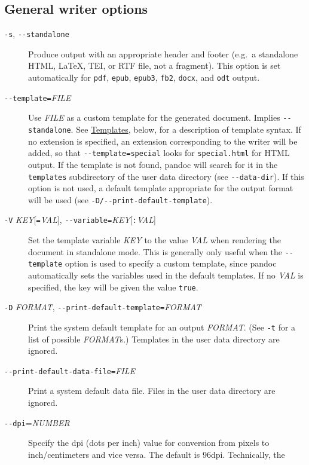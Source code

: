 \documentclass[]{article}
\begin{document}
\subsection{General writer options}\label{general-writer-options}

\begin{description}
\item[\texttt{-s}, \texttt{-\/-standalone}]
Produce output with an appropriate header and footer (e.g.~a standalone
HTML, LaTeX, TEI, or RTF file, not a fragment). This option is set
automatically for \texttt{pdf}, \texttt{epub}, \texttt{epub3},
\texttt{fb2}, \texttt{docx}, and \texttt{odt} output.
\item[\texttt{-\/-template=}\emph{FILE}]
Use \emph{FILE} as a custom template for the generated document. Implies
\texttt{-\/-standalone}. See \protect\hyperlink{templates}{Templates},
below, for a description of template syntax. If no extension is
specified, an extension corresponding to the writer will be added, so
that \texttt{-\/-template=special} looks for \texttt{special.html} for
HTML output. If the template is not found, pandoc will search for it in
the \texttt{templates} subdirectory of the user data directory (see
\texttt{-\/-data-dir}). If this option is not used, a default template
appropriate for the output format will be used (see
\texttt{-D/-\/-print-default-template}).
\item[\texttt{-V} \emph{KEY}{[}\texttt{=}\emph{VAL}{]},
\texttt{-\/-variable=}\emph{KEY}{[}\texttt{:}\emph{VAL}{]}]
Set the template variable \emph{KEY} to the value \emph{VAL} when
rendering the document in standalone mode. This is generally only useful
when the \texttt{-\/-template} option is used to specify a custom
template, since pandoc automatically sets the variables used in the
default templates. If no \emph{VAL} is specified, the key will be given
the value \texttt{true}.
\item[\texttt{-D} \emph{FORMAT},
\texttt{-\/-print-default-template=}\emph{FORMAT}]
Print the system default template for an output \emph{FORMAT}. (See
\texttt{-t} for a list of possible \emph{FORMAT}s.) Templates in the
user data directory are ignored.
\item[\texttt{-\/-print-default-data-file=}\emph{FILE}]
Print a system default data file. Files in the user data directory are
ignored.
\item[\texttt{-\/-dpi}=\emph{NUMBER}]
Specify the dpi (dots per inch) value for conversion from pixels to
inch/centimeters and vice versa. The default is 96dpi. Technically, the

\end{description}
\end{document}
